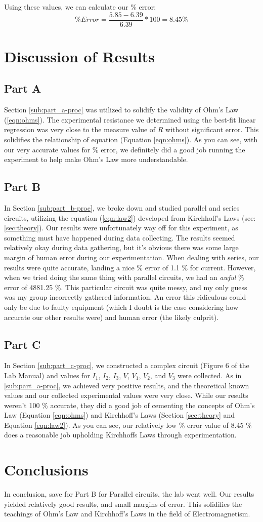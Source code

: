 \documentclass[titlepage]{article}
\begin{document}
Using these values, we can calculate our \% error:
\[
	\% Error = \frac{5.85 - 6.39}{6.39} * 100 = 8.45 \%
\]

\section{Discussion of Results}\label{sec:discussion_of_results}
\subsection{Part A}\label{sub:part_a-discussion}
Section \ref{sub:part_a-proc} was utilized to solidify the validity of Ohm's Law (\ref{eqn:ohms}). The experimental resistance we determined using the best-fit linear regression was very close to the measure value of $R$ without significant error. This solidifies the relationship of equation (Equation \ref{eqn:ohms}). As you can see, with our very accurate values for \% error, we definitely did a good job running the experiment to help make Ohm's Law more understandable.

\subsection{Part B}\label{sub:part_b-discussion}
In Section \ref{sub:part_b-proc}, we broke down and studied parallel and series circuits, utilizing the equation (\ref{eqn:law2}) developed from Kirchhoff's Laws (see: \ref{sec:theory}). Our results were unfortunately way off for this experiment, as something must have happened during data collecting. The results seemed relatively okay during data gathering, but it's obvious there was some large margin of human error during our experimentation. When dealing with series, our results were quite accurate, landing a nice \% error of 1.1 \% for current. However, when we tried doing the same thing with parallel circuits, we had an \textit{awful} \% error of 4881.25 \%. This particular circuit was quite messy, and my only guess was my group incorrectly gathered information. An error this ridiculous could only be due to faulty equipment (which I doubt is the case considering how accurate our other results were) and human error (the likely culprit).

\subsection{Part C}\label{sub:part_c-discussion}
In Section \ref{sub:part_c-proc}, we constructed a complex circuit (Figure 6 of the Lab Manual) and values for $I_1$, $I_2$, $I_3$, $V$, $V_1$, $V_2$, and $V_3$ were collected. As in \ref{sub:part_a-proc}, we achieved very positive results, and the theoretical known values and our collected experimental values were very close. While our results weren't 100 \% accurate, they did a good job of cementing the concepts of Ohm's Law (Equation \ref{eqn:ohms}) and Kirchhoff's Laws (Section \ref{sec:theory} and Equation \ref{eqn:law2}). As you can see, our relatively low \% error value of 8.45 \% does a reasonable job upholding Kirchhoffs Laws through experimentation.

\section{Conclusions}\label{sec:conclusions}
In conclusion, save for Part B for Parallel circuits, the lab went well. Our results yielded relatively good results, and small margins of error. This solidifies the teachings of Ohm's Law and Kirchhoff's Laws in the field of Electromagnetism. 
\end{document}
